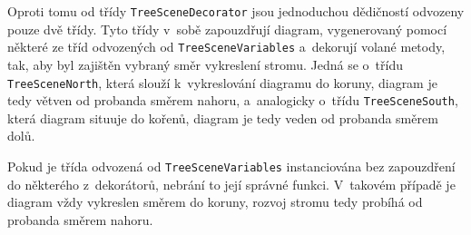 		Oproti tomu od třídy \texttt{TreeSceneDecorator} jsou jednoduchou dědičností odvozeny pouze dvě třídy. Tyto třídy v~sobě zapouzdřují diagram, vygenerovaný pomocí některé ze tříd odvozených od \texttt{TreeSceneVariables} a~dekorují volané metody, tak, aby byl zajištěn vybraný směr vykreslení stromu. Jedná se o~třídu \texttt{TreeSceneNorth}, která slouží k~vykreslování diagramu do koruny, diagram je tedy větven od probanda směrem nahoru, a~analogicky o~třídu \texttt{TreeSceneSouth}, která diagram situuje do kořenů, diagram je tedy veden od probanda směrem dolů.\par
		Pokud je třída odvozená od \texttt{TreeSceneVariables} instanciována bez zapouzdření do některého z~dekorátorů, nebrání to její správné funkci. V~takovém případě je diagram vždy vykreslen směrem do koruny, rozvoj stromu tedy probíhá od probanda směrem nahoru.\par
		
